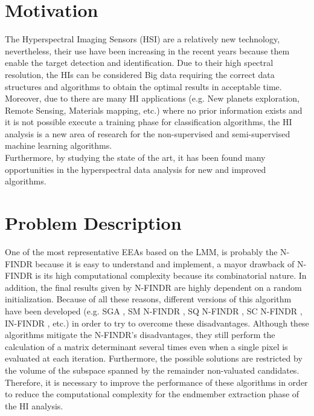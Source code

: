 \documentclass[11pt, oneside]{Thesis} %
\begin{document}
\section{Motivation}

The Hyperspectral Imaging Sensors (HSI) are a relatively new technology, nevertheless, their 
use have been increasing in the recent years because them enable the target detection and 
identification. Due to their high spectral resolution, 
the HIs can be considered Big data \cite{BigData} requiring the correct data structures and 
algorithms to obtain the optimal results in acceptable time. \\

Moreover, due to there are many HI applications (e.g. New planets exploration, 
Remote Sensing, Materials mapping, etc.) where no prior information exists and 
it is not possible execute a training phase for classification algorithms, 
the HI analysis is a new area of research for the non-supervised and 
semi-supervised \cite{SemiSupervised} machine learning algorithms. \\

Furthermore, by studying the state of the art, it has been found many 
opportunities in the hyperspectral data analysis for new and improved algorithms.
 

\section{Problem Description}

One of the most representative EEAs based on the LMM, is probably the N-FINDR because 
it is easy to understand and implement, a mayor drawback of N-FINDR is its high 
computational complexity because its combinatorial nature. In addition, the final 
results given by N-FINDR are highly dependent on a random initialization. 
Because of all these reasons, different versions of this 
algorithm have been developed (e.g. SGA \cite{SGA}, SM N-FINDR \cite{NFINDR-VERSIONS}, 
SQ N-FINDR \cite{NFINDR-VERSIONS}, SC N-FINDR \cite{NFINDR-VERSIONS}, 
IN-FINDR \cite{NFINDR-VERSIONS}, etc.) in order to try to overcome these disadvantages. 
Although these algorithms mitigate the N-FINDR's disadvantages, they still perform the calculation 
of a matrix determinant several times even when a single pixel is evaluated at each iteration. 
Furthermore, the possible solutions are restricted by the volume of the subspace spanned by 
the remainder non-valuated candidates. Therefore, it is necessary to improve the 
performance of these algorithms in order to reduce the computational complexity for the 
endmember extraction phase of the HI analysis.  \\
\end{document}

